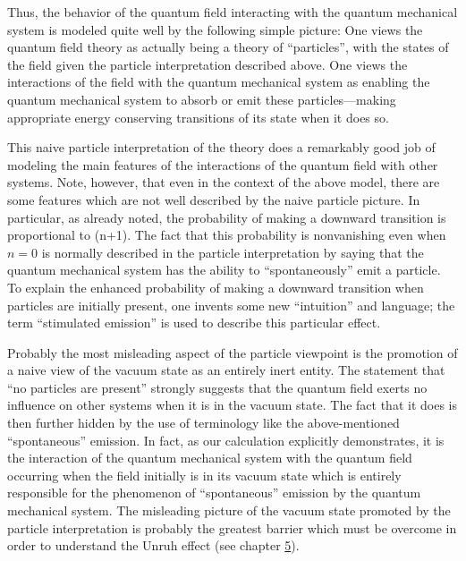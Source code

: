 \documentclass[11pt,a4paper]{article}
\begin{document}
Thus, the behavior of the quantum field interacting with the quantum mechanical system is modeled quite well by the following simple picture: One views the quantum field theory as actually being a theory of ``particles'', with the states of the field given the particle interpretation described above. One views the interactions of the field with the quantum mechanical system as enabling the quantum mechanical system to absorb or emit these particles---making\hypertarget{source-64}{} appropriate energy conserving transitions of its state when it does so.

This naive particle interpretation of the theory does a remarkably good job of modeling the main features of the interactions of the quantum field with other systems. Note, however, that even in the context of the above model, there are some features which are not well described by the naive particle picture. In particular, as already noted, the probability of making a downward transition is proportional to (n+1). The fact that this probability is nonvanishing even when \(n=0\) is normally described in the particle interpretation by saying that the quantum mechanical system has the ability to ``spontaneously'' emit a particle. To explain the enhanced probability of making a downward transition when particles are initially present, one invents some new ``intuition'' and language; the term ``stimulated emission'' is used to describe this particular effect.

Probably the most misleading aspect of the particle viewpoint is the promotion of a naive view of the vacuum state as an entirely inert entity. The statement that ``no particles are present'' strongly suggests that the quantum field exerts no influence on other systems when it is in the vacuum state. The fact that it does is then further hidden by the use of terminology like the above-mentioned ``spontaneous'' emission. In fact, as our calculation explicitly demonstrates, it is the interaction of the quantum mechanical system with the quantum field occurring when the field initially is in its vacuum state which is entirely responsible for the phenomenon of ``spontaneous'' emission by the quantum mechanical system. The misleading picture of the vacuum state promoted by the particle interpretation is probably the greatest barrier which must be overcome in order to understand the Unruh effect (see chapter \hyperlink{sec:5}{5}).
\end{document}
